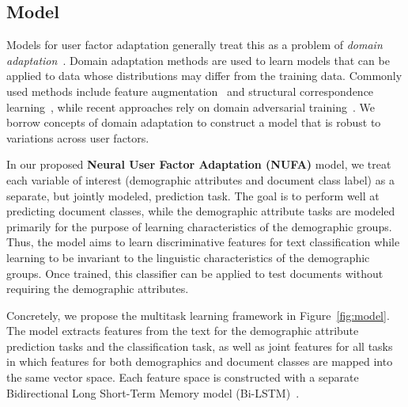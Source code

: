 \subsection{Model}
\label{sec:model}

Models for user factor adaptation generally treat
this as a problem of {\em domain adaptation}~\cite{volkova2013exploring,lynn2017human}.
Domain adaptation methods are used to learn models that can be applied to data whose distributions may differ from the training data.
Commonly used methods include feature augmentation~\cite{daume2007frustratingly, joshi2013s, huang2018examining}
and structural correspondence learning~\cite{blitzer2006domain},
while recent approaches rely on 
domain adversarial training~\cite{ganin2016domain, chen2016adversarial, liu2017adversarial, huang2018modeling}. 
We borrow concepts of domain adaptation to construct a model that is robust to variations across user factors.


In our proposed {\bf Neural User Factor Adaptation (NUFA)} model, we treat each variable of interest (demographic attributes and document class label) as a separate, but jointly modeled, prediction task.
The goal is to perform well at predicting document classes, while the demographic attribute tasks are modeled primarily for the purpose of learning characteristics of the demographic groups.
Thus, the model aims to learn discriminative features for text classification while learning to be invariant to the linguistic characteristics of the demographic groups. 
Once trained, this classifier can be applied to test documents without requiring the demographic attributes.

Concretely, we propose the multitask learning framework in Figure~\ref{fig:model}. 
The model extracts features from the text for the demographic attribute prediction tasks and the classification task, as well as joint features for all tasks in which features for both demographics and document classes are mapped into the same vector space.
Each feature space is constructed with a separate Bidirectional Long Short-Term Memory model (Bi-LSTM)~\cite{hochreiter1997long}.

